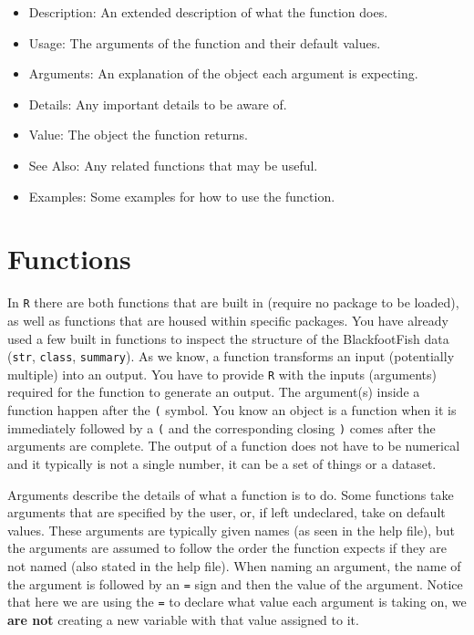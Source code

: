 \documentclass[]{article}
\providecommand{\tightlist}{%
  \setlength{\itemsep}{0pt}\setlength{\parskip}{0pt}}
\begin{document}
\begin{itemize}
\tightlist
\item
  Description: An extended description of what the function does.\\
\item
  Usage: The arguments of the function and their default values.\\
\item
  Arguments: An explanation of the object each argument is expecting.\\
\item
  Details: Any important details to be aware of.\\
\item
  Value: The object the function returns.\\
\item
  See Also: Any related functions that may be useful.\\
\item
  Examples: Some examples for how to use the function.
\end{itemize}

\section{Functions}\label{functions}

In \texttt{R} there are both functions that are built in (require no
package to be loaded), as well as functions that are housed within
specific packages. You have already used a few built in functions to
inspect the structure of the BlackfootFish data (\texttt{str},
\texttt{class}, \texttt{summary}). As we know, a function transforms an
input (potentially multiple) into an output. You have to provide
\texttt{R} with the inputs (arguments) required for the function to
generate an output. The argument(s) inside a function happen after the
\texttt{(} symbol. You know an object is a function when it is
immediately followed by a \texttt{(} and the corresponding closing
\texttt{)} comes after the arguments are complete. The output of a
function does not have to be numerical and it typically is not a single
number, it can be a set of things or a dataset.

Arguments describe the details of what a function is to do. Some
functions take arguments that are specified by the user, or, if left
undeclared, take on default values. These arguments are typically given
names (as seen in the help file), but the arguments are assumed to
follow the order the function expects if they are not named (also stated
in the help file). When naming an argument, the name of the argument is
followed by an \texttt{=} sign and then the value of the argument.
Notice that here we are using the \texttt{=} to declare what value each
argument is taking on, we \textbf{are not} creating a new variable with
that value assigned to it.
\end{document}
